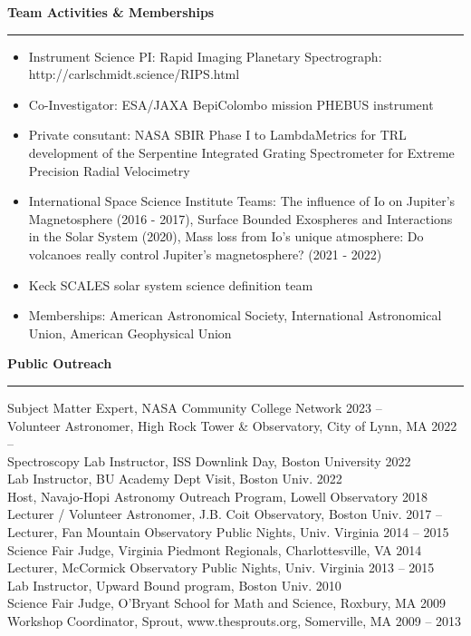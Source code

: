 \documentclass[12pt]{report}
\begin{document}
\noindent\bf{Team Activities \& Memberships}\rm \hspace*{\fill} \\
\rule{\textwidth}{1pt}
\begin{itemize} \itemsep -2pt %
  \item Instrument Science PI: Rapid Imaging Planetary Spectrograph: http://carlschmidt.science/RIPS.html
  \item Co-Investigator: ESA/JAXA BepiColombo mission PHEBUS instrument
  \item Private consutant: NASA SBIR Phase I to LambdaMetrics for TRL development of the Serpentine Integrated Grating Spectrometer for Extreme Precision
Radial Velocimetry
  \item International Space Science Institute Teams: The influence of Io on Jupiter's Magnetosphere (2016 - 2017), Surface Bounded Exospheres and Interactions in the Solar System (2020), Mass loss from Io’s unique atmosphere: Do volcanoes really control Jupiter’s magnetosphere? (2021 - 2022)
  \item Keck SCALES solar system science definition team
  \item Memberships: American Astronomical Society, International Astronomical Union, American Geophysical Union
\end{itemize}
\vspace{2 mm}

\noindent\bf{Public Outreach}\rm \hspace*{\fill} \\
\rule{\textwidth}{1pt}
\noindent Subject Matter Expert, NASA Community College Network \hfill 2023 –     \\
\noindent Volunteer Astronomer, High Rock Tower \& Observatory, City of Lynn, MA \hfill 2022 –     \\
\noindent Spectroscopy Lab Instructor, ISS Downlink Day, Boston University \hfill 2022\\
\noindent Lab Instructor, BU Academy Dept Visit, Boston Univ. \hfill 2022\\
\noindent Host, Navajo-Hopi Astronomy Outreach Program, Lowell Observatory \hfill 2018\\
\noindent Lecturer / Volunteer Astronomer, J.B. Coit Observatory, Boston Univ.	 \hfill 2017 –     \\
\noindent Lecturer, Fan Mountain Observatory Public Nights, Univ. Virginia \hfill 2014 – 2015\\
\noindent Science Fair Judge, Virginia Piedmont Regionals, Charlottesville, VA \hfill 2014\\
\noindent Lecturer, McCormick Observatory Public Nights, Univ. Virginia	 \hfill 2013 – 2015\\
\noindent Lab Instructor, Upward Bound program, Boston Univ. \hfill 2010\\
\noindent Science Fair Judge, O'Bryant School for Math and Science, Roxbury, MA \hfill 2009\\
\noindent Workshop Coordinator, Sprout, www.thesprouts.org, Somerville, MA \hfill 2009 – 2013\\
\end{document}
